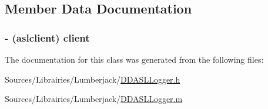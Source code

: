 \subsection{Member Data Documentation}
\hypertarget{interface_d_d_a_s_l_logger_aff7f5e829ed7489ae7d58ff2c8629461}{
\subsubsection[{client}]{\setlength{\rightskip}{0pt plus 5cm}-\/ (aslclient) client\hspace{0.3cm}{\ttfamily [protected]}}}\label{interface_d_d_a_s_l_logger_aff7f5e829ed7489ae7d58ff2c8629461}


The documentation for this class was generated from the following files\-:\begin{DoxyCompactItemize}
\item 
Sources/\-Librairies/\-Lumberjack/\hyperlink{_d_d_a_s_l_logger_8h}{D\-D\-A\-S\-L\-Logger.\-h}\item 
Sources/\-Librairies/\-Lumberjack/\hyperlink{_d_d_a_s_l_logger_8m}{D\-D\-A\-S\-L\-Logger.\-m}\end{DoxyCompactItemize}
